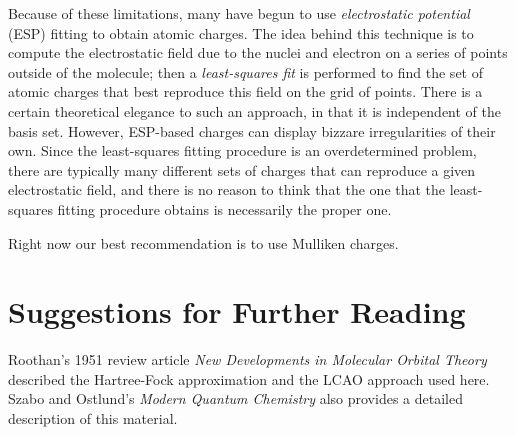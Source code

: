 Because of these limitations, many have begun to use
\emph{electrostatic potential} (ESP) fitting to obtain atomic
charges. The idea behind this technique is to compute the
electrostatic field due to the nuclei and electron on a series of
points outside of the molecule; then a \emph{least-squares fit} is
performed to find the set of atomic charges that best reproduce this
field on the grid of points. There is a certain theoretical elegance
to such an approach, in that it is independent of the basis
set. However, ESP-based charges can display bizzare irregularities of
their own. Since the least-squares fitting procedure is an
overdetermined problem, there are typically many different sets of
charges that can reproduce a given electrostatic field, and there is
no reason to think that the one that the least-squares fitting
procedure obtains is necessarily the proper one.

Right now our best recommendation is to use Mulliken charges.

\section{Suggestions for Further Reading}
Roothan's 1951 review article \emph{New Developments in
Molecular Orbital Theory} \cite{Roothan51} described the Hartree-Fock
approximation and the LCAO approach used here. Szabo and Ostlund's
\emph{Modern Quantum Chemistry} \cite{Szabo82} also provides a
detailed description of this material.

